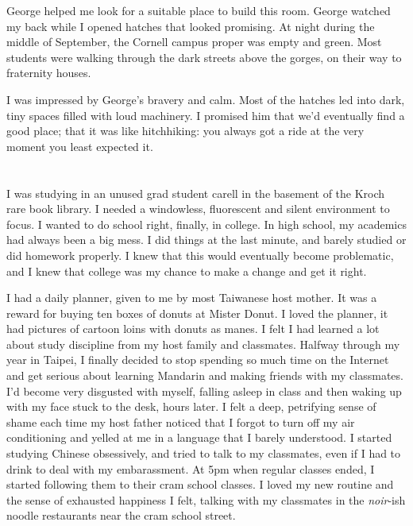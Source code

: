 George helped me look for a suitable place to build this room.  George watched
my back while I opened hatches that looked promising.  At night during the
middle of September, the Cornell campus proper was empty and green.  Most students
were walking through the dark streets above the gorges, on their way to
fraternity houses.

I was impressed by George's bravery and calm.  Most of the hatches led into
dark, tiny spaces filled with loud machinery.  I promised him that we'd
eventually find a good place; that it was like hitchhiking: you always got a
ride at the very moment you least expected it.

\section{}

I was studying in an unused grad student carell in the basement of the Kroch
rare book library.  I needed a windowless, fluorescent and silent environment to
focus.  I wanted to do school right, finally, in college.  In high school, my
academics had always been a big mess.  I did things at the last minute, and
barely studied or did homework properly.  I knew that this would eventually
become problematic, and I knew that college was my chance to make a change and
get it right. 


I had a daily planner, given to me by most Taiwanese host mother.  It was a
reward for buying ten boxes of donuts at Mister Donut.  I loved the planner, it
had pictures of cartoon loins with donuts as manes. I felt I had learned a lot
about study discipline from my host family and classmates.  Halfway through my
year in Taipei, I finally decided to stop spending so much time on the Internet
and get serious about learning Mandarin and making friends with my classmates.
I'd become very disgusted with myself, falling asleep in class and then waking
up with my face stuck to the desk, hours later.  I felt a deep, petrifying sense
of shame each time my host father noticed that I forgot to turn off my air
conditioning and yelled at me in a language that I barely understood.  I started
studying Chinese obsessively, and tried to talk to my classmates, even if I had
to drink to deal with my embarassment.  At 5pm when regular classes ended, I
started following them to their cram school classes.  I loved my new routine and
the sense of exhausted happiness I felt, talking with my classmates in the
\textit{noir}-ish noodle restaurants near the cram school street. 

